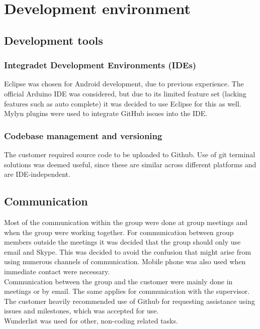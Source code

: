 \section{Development environment}
\subsection{Development tools}
\subsubsection{Integradet Development Environments (IDEs)}
Eclipse was chosen for Android development, due to previous experience. The official Arduino IDE was considered, but due to its limited feature set (lacking features such as auto complete) it was decided to use Eclipse for this as well.\\
Mylyn plugins were used to integrate GitHub issues into the IDE.

\subsubsection{Codebase management and versioning}
The customer required source code to be uploaded to Github. Use of git terminal solutions was deemed useful, since these are similar across different platforms and are IDE-independent.

\subsection{Communication}
Most of the communication within the group were done at group meetings and when the group were working together. For communication between group members outside the meetings it was decided that the group should only use email and Skype. This was decided to avoid the confusion that might arise from using numerous channels of communication. Mobile phone was also used when immediate contact were necessary.\\
\newline
Communication between the group and the customer were mainly done in meetings or by email. The same applies for communication with the supervisor.\\
The customer heavily recommended use of Github for requesting assistance using issues and milestones, which was accepted for use.\\
Wunderlist was used for other, non-coding related tasks.


